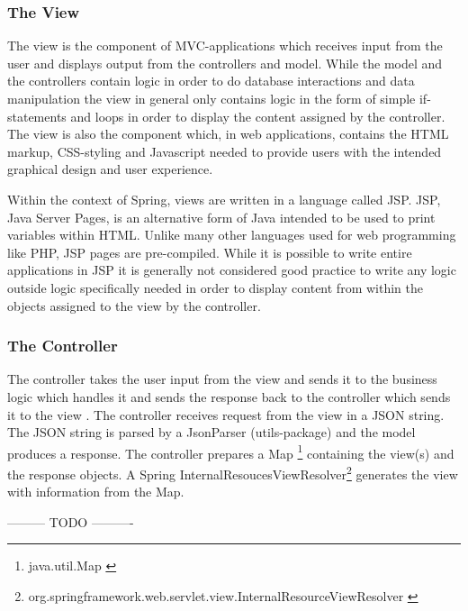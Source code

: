 \subsubsection{The View}
The view is the component of MVC-applications which receives input from the user and displays output from the controllers and model. While the model and the controllers contain logic in order to do database interactions and data manipulation the view in general only contains logic in the form of simple if-statements and loops in order to display the content assigned by the controller. The view is also the component which, in web applications, contains the HTML markup, CSS-styling and Javascript needed to provide users with the intended graphical design and user experience.

Within the context of Spring, views are written in a language called JSP. JSP, Java Server Pages, is an alternative form of Java intended to be used to print variables within HTML. Unlike many other languages used for web programming like PHP, JSP pages are pre-compiled. While it is possible to write entire applications in JSP it is generally not considered good practice to write any logic outside logic specifically needed in order to display content from within the objects assigned to the view by the controller.

\subsubsection{The Controller}
The controller takes the user input from the view and sends it to the business logic which handles it and sends the response back to the controller which sends it to the view \citep{Oracle}. The controller receives request from the view in a JSON string. The JSON string is parsed by a JsonParser (utils-package) and the model produces a response. The controller prepares a Map \footnote{java.util.Map \citep{Oraclea}} containing the view(s) and the response objects. A Spring InternalResoucesViewResolver\footnote{org.springframework.web.servlet.view.InternalResourceViewResolver \citep{TheSpring} }  generates the view with information  from the Map.

--------- TODO ---------- 

